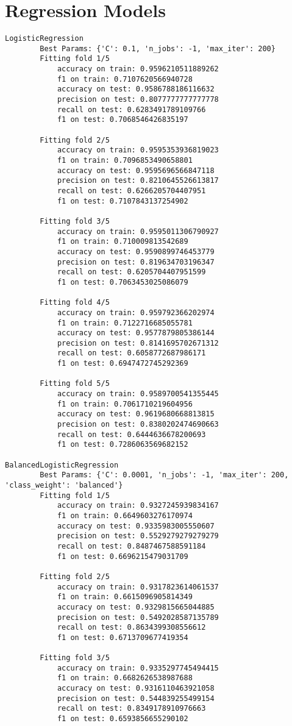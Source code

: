 \section{Regression Models}
\begin{verbatim}
LogisticRegression
		Best Params: {'C': 0.1, 'n_jobs': -1, 'max_iter': 200}
		Fitting fold 1/5
			accuracy on train: 0.9596210511889262
			f1 on train: 0.7107620566940728
			accuracy on test: 0.9586788186116632
			precision on test: 0.8077777777777778
			recall on test: 0.6283491789109766
			f1 on test: 0.7068546426835197

		Fitting fold 2/5
			accuracy on train: 0.9595353936819023
			f1 on train: 0.7096853490658801
			accuracy on test: 0.9595696566847118
			precision on test: 0.8210645526613817
			recall on test: 0.6266205704407951
			f1 on test: 0.7107843137254902

		Fitting fold 3/5
			accuracy on train: 0.9595011306790927
			f1 on train: 0.710009813542689
			accuracy on test: 0.9590899746453779
			precision on test: 0.819634703196347
			recall on test: 0.6205704407951599
			f1 on test: 0.7063453025086079

		Fitting fold 4/5
			accuracy on train: 0.959792366202974
			f1 on train: 0.7122716685055781
			accuracy on test: 0.9577879805386144
			precision on test: 0.8141695702671312
			recall on test: 0.6058772687986171
			f1 on test: 0.6947472745292369

		Fitting fold 5/5
			accuracy on train: 0.9589700541355445
			f1 on train: 0.7061710219604956
			accuracy on test: 0.9619680668813815
			precision on test: 0.8380202474690663
			recall on test: 0.6444636678200693
			f1 on test: 0.7286063569682152

BalancedLogisticRegression
		Best Params: {'C': 0.0001, 'n_jobs': -1, 'max_iter': 200, 'class_weight': 'balanced'}
		Fitting fold 1/5
			accuracy on train: 0.9327245939834167
			f1 on train: 0.6649603276170974
			accuracy on test: 0.9335983005550607
			precision on test: 0.5529279279279279
			recall on test: 0.8487467588591184
			f1 on test: 0.6696215479031709

		Fitting fold 2/5
			accuracy on train: 0.9317823614061537
			f1 on train: 0.6615096905814349
			accuracy on test: 0.9329815665044885
			precision on test: 0.5492028587135789
			recall on test: 0.8634399308556612
			f1 on test: 0.6713709677419354

		Fitting fold 3/5
			accuracy on train: 0.9335297745494415
			f1 on train: 0.6682626538987688
			accuracy on test: 0.9316110463921058
			precision on test: 0.544839255499154
			recall on test: 0.8349178910976663
			f1 on test: 0.6593856655290102


\end{verbatim}
